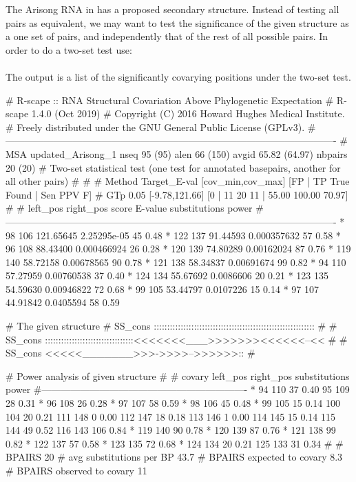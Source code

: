 The Arisong RNA in  has a proposed
secondary structure.  Instead of testing all pairs as equivalent, we
may want to test the significance of the given structure as a one set
of pairs, and independently that of the rest of all possible pairs.
In order to do a two-set test use:\\

\\

\noindent
The output is a list of the significantly covarying positions under the two-set test.

\begin{sreoutput}
# R-scape :: RNA Structural Covariation Above Phylogenetic Expectation
# R-scape 1.4.0 (Oct 2019)
# Copyright (C) 2016 Howard Hughes Medical Institute.
# Freely distributed under the GNU General Public License (GPLv3).
#-------------------------------------------------------------------------------------------------------
# MSA updated_Arisong_1 nseq 95 (95) alen 66 (150) avgid 65.82 (64.97) nbpairs 20 (20)
# Two-set statistical test (one test for annotated basepairs, another for all other pairs)
#
#
# Method Target_E-val [cov_min,cov_max] [FP | TP True Found | Sen PPV F] 
# GTp    0.05         [-9.78,121.66]     [0 | 11 20 11 | 55.00 100.00 70.97] 
#
#       left_pos       right_pos        score          E-value       substitutions      power
#-------------------------------------------------------------------------------------------------------
*	      98	     106	121.65645	2.25295e-05	45		0.48
*	     122	     137	91.44593	0.000357632	57		0.58
*	      96	     108	88.43400	0.000466924	26		0.28
*	     120	     139	74.80289	0.00162024	87		0.76
*	     119	     140	58.72158	0.00678565	90		0.78
*	     121	     138	58.34837	0.00691674	99		0.82
*	      94	     110	57.27959	0.00760538	37		0.40
*	     124	     134	55.67692	0.0086606	20		0.21
*	     123	     135	54.59630	0.00946822	72		0.68
*	      99	     105	53.44797	0.0107226	15		0.14
*	      97	     107	44.91842	0.0405594	58		0.59

# The given structure
# SS_cons ::::::::::::::::::::::::::::::::::::::::::::::::::::::::::::
#
# SS_cons :::::::::::::::::::::::::::::::::<<<<<<<___>>>>>>><<<<<<--<<
#
# SS_cons <<<<<_______>>>->>>>-->>>>>>::
#

# Power analysis of given structure 
#
# covary  left_pos      right_pos    substitutions      power
#----------------------------------------------------------------
     *    94		110		37		0.40
          95		109		28		0.31
     *    96		108		26		0.28
     *    97		107		58		0.59
     *    98		106		45		0.48
     *    99		105		15		0.14
          100		104		20		0.21
          111		148		0		0.00
          112		147		18		0.18
          113		146		1		0.00
          114		145		15		0.14
          115		144		49		0.52
          116		143		106		0.84
     *    119		140		90		0.78
     *    120		139		87		0.76
     *    121		138		99		0.82
     *    122		137		57		0.58
     *    123		135		72		0.68
     *    124		134		20		0.21
          125		133		31		0.34
#
# BPAIRS 20
# avg substitutions per BP  43.7
# BPAIRS expected to covary 8.3
# BPAIRS observed to covary 11
\end{sreoutput}
